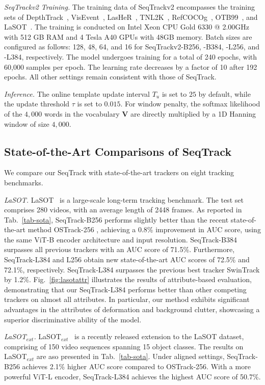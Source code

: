 \textit{SeqTrackv2 Training.} 
The training data of SeqTrackv2 encompasses the training sets of DepthTrack~\cite{depthtrack}, VisEvent~\cite{visevent}, LasHeR~\cite{lasher}, TNL2K~\cite{TNL2K}, RefCOCOg~\cite{refcocog}, OTB99~\cite{TNLS}, and LaSOT~\cite{lasot_journal}. The training is conducted on Intel Xeon CPU Gold 6330 @ 2.00GHz with 512 GB RAM and 4 Tesla A40 GPUs with 48GB memory. Batch sizes are configured as follows: 128, 48, 64, and 16 for SeqTrackv2-B256, -B384, -L256, and -L384, respectively. The model undergoes training for a total of 240 epochs, with 60,000 samples per epoch. The learning rate decreases by a factor of 10 after 192 epochs. All other settings remain consistent with those of SeqTrack.

\textit{Inference.}
The online template update interval $T_u$ is set to $25$ by default, while the update threshold $\tau$ is set to $0.015$. For window penalty, the softmax likelihood of the $4,000$ words in the vocabulary $\bm{V}$ are directly multiplied by a 1D Hanning window of size $4,000$.

\subsection{State-of-the-Art Comparisons of SeqTrack}
\label{subsec:sotav1}

We compare our SeqTrack with state-of-the-art trackers on eight tracking benchmarks.

\textit{LaSOT.}
LaSOT~\cite{LaSOT} is a large-scale long-term tracking benchmark. The test set comprises 280 videos, with an average length of 2448 frames. As reported in Tab.~\ref{tab-sota}, SeqTrack-B256 performs slightly better than the recent state-of-the-art method OSTrack-256 \cite{ostrack}, achieving a 0.8\% improvement in AUC score, using the same ViT-B encoder architecture and input resolution.  SeqTrack-B384 surpasses all previous trackers with an AUC score of 71.5\%.  Furthermore, SeqTrack-L384 and L256 obtain new state-of-the-art AUC scores of 72.5\% and 72.1\%, respectively. SeqTrack-L384 surpasses the previous best tracker SwinTrack \cite{swintrack} by 1.2\%.
Fig.~\ref{fig:lasotattr} illustrates the results of attribute-based evaluation, demonstrating that our SeqTrack-L384 performs better than other competing trackers on almost all attributes. In particular, our method exhibits significant advantages in the attributes of deformation and background clutter, showcasing a superior discriminative ability of the model. 

\textit{LaSOT$_{ext}$.}
LaSOT$_{ext}$~\cite{lasot_journal} is a recently released extension to the LaSOT dataset, comprising of 150 video sequences spanning 15 object classes. The results on LaSOT$_{ext}$ are aso presented in Tab.~\ref{tab-sota}.
Under aligned settings, SeqTrack-B256 achieves 2.1\% higher AUC score compared to OSTrack-256. With a more powerful ViT-L encoder, SeqTrack-L384 achieves the highest AUC score of 50.7\%.

